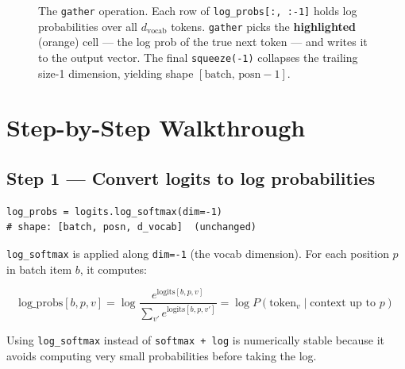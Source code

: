 \documentclass[10pt]{article}
\begin{document}
\begin{figure}[H]
\caption{The \texttt{gather} operation. Each row of
\texttt{log\_probs[:,\,:-1]} holds log probabilities over all $d_\text{vocab}$
tokens. \texttt{gather} picks the \textbf{highlighted} (orange) cell ---
the log prob of the true next token --- and writes it to the output vector.
The final \texttt{squeeze(-1)} collapses the trailing size-1 dimension,
yielding shape $[\text{batch},\,\text{posn}{-}1]$.}
\end{figure}

\section{Step-by-Step Walkthrough}

\subsection{Step 1 --- Convert logits to log probabilities}

\begin{lstlisting}
log_probs = logits.log_softmax(dim=-1)
# shape: [batch, posn, d_vocab]  (unchanged)
\end{lstlisting}

\texttt{log\_softmax} is applied along \texttt{dim=-1} (the vocab dimension).
For each position $p$ in batch item $b$, it computes:

\[
  \text{log\_probs}[b, p, v] = \log \frac{e^{\text{logits}[b,p,v]}}{\sum_{v'} e^{\text{logits}[b,p,v']}}
  = \log P(\text{token}_v \mid \text{context up to } p)
\]

Using \texttt{log\_softmax} instead of \texttt{softmax + log} is numerically
stable because it avoids computing very small probabilities before taking the log.
\end{document}

